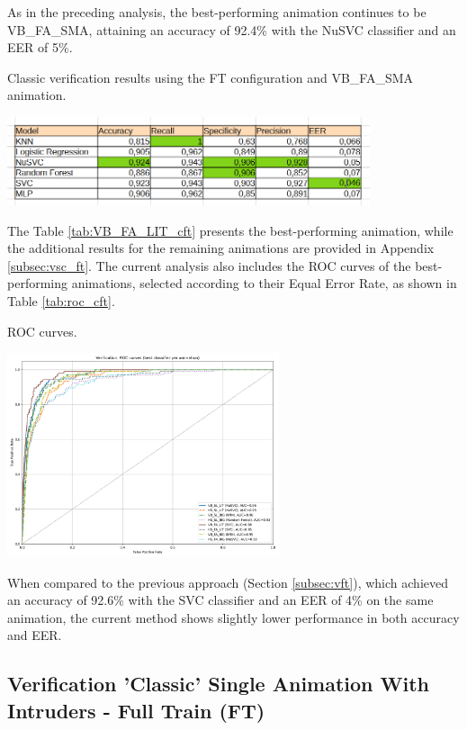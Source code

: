 \documentclass[12pt]{report}
\begin{document}
As in the preceding analysis, the best-performing animation continues to be VB\_FA\_SMA, attaining an accuracy of 92.4\% with the NuSVC classifier and an EER of 5\%.

\begin{table}[ht]
    \centering
    \caption{Classic verification results using the FT configuration and VB\_FA\_SMA animation.}
    \includegraphics[width=0.8\textwidth]{Images/Results/Classic_procedure/Verification_single/ft/VB_FA_LIT.png}
    \label{tab:VB_FA_LIT_cft}
\end{table}

The Table \ref{tab:VB_FA_LIT_cft} presents the best-performing animation, while the additional results for the remaining animations are provided in Appendix \ref{subsec:vsc_ft}.
The current analysis also includes the ROC curves of the best-performing animations, selected according to their Equal Error Rate, as shown in Table \ref{tab:roc_cft}.

\begin{table}[ht]
    \centering
    \caption{ROC curves.}
    \includegraphics[width=0.6\textwidth]{Images/Results/Classic_procedure/Verification_single/ft/Verification_single_roc_classic_ft.png}
    \label{tab:roc_cft}
\end{table}

When compared to the previous approach (Section \ref{subsec:vft}), which achieved an accuracy of 92.6\% with the SVC classifier and an EER of 4\% on the same animation, the current method shows slightly lower performance in both accuracy and EER.
\FloatBarrier

\subsection{Verification 'Classic' Single Animation With Intruders - Full Train (FT)}
\end{document}
